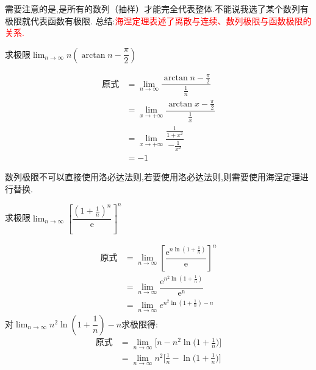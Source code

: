 \documentclass[8pt a4paper, oneside, UTF8]{ctexbook}
\begin{document}
\begin{sloppypar}
\begin{center}
    \end{center}
    需要注意的是,是所有的数列（抽样）才能完全代表整体.不能说我选了某个数列有极限就代表函数有极限.
    总结:\textcolor{red}{海涅定理表述了离散与连续、数列极限与函数极限的关系.}
    \begin{problem}
        求极限$\lim_{n \to \infty}n(\arctan n -\dfrac{\pi}{2})$
    \end{problem}
    \begin{solution}
          \begin{align*}
            \text{原式} & = \lim_{n \to \infty}\dfrac{\arctan n-\frac{\pi}{2}}{\frac{1}{n}} \\     
            & =  \lim_{x \to +\infty}\dfrac{\arctan x -\frac{\pi}{2}}{\frac{1}{x}}\\
            & = \lim_{x\to+\infty}\dfrac{\frac1{1+x^2}}{-\frac1{x^2}}\\
            & = -1
          \end{align*}  
    \end{solution}
    \begin{note}
        数列极限不可以直接使用洛必达法则,若要使用洛必达法则,则需要使用海涅定理进行替换.
    \end{note}
    \begin{problem}
        求极限$\lim_{n\to\infty}\left[\dfrac{\left(1+\frac1n\right)^n}{\mathrm{e}}\right]^n$   
    \end{problem}
    \begin{solution}
        \begin{align*}
          \text{原式} & = \lim_{n\to\infty}\left[\dfrac{\mathrm{e}^{n\ln\left(1+\frac1n\right)}}{\mathrm{e}}\right]^n    \\
          & = \lim_{n\to\infty}\dfrac{\mathrm{e}^{n^2\ln\left(1+\frac1n\right)}}{\mathrm{e^n}}\\
          & =\lim_{n \to \infty} e^{n^2\ln(1+\frac{1}{n})-n}
        \end{align*}
        对$\lim_{n \to \infty} n^2\ln(1+\dfrac{1}{n})-n$求极限得:
        \begin{align*}
          \text{原式} & = \lim_{n\to\infty}\biggl[n-n^2\ln\biggl(1+\frac{1}{n}\biggr)\biggr] \\
          & =  \lim_{n\to\infty}n^2\biggl[\frac{1}{n}-\ln\biggl(1+\frac{1}{n}\biggr)\biggr] \\

\end{align*}
\end{solution}
\end{sloppypar}
\end{document}
